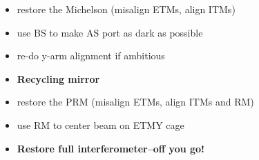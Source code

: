 \begin{itemize}
\item restore the Michelson (misalign ETMs, align ITMs) \vspace{-10pt}
\item use BS to make AS port as dark as possible \vspace{-10pt}
\item re-do y-arm alignment if ambitious 
\item[] \textbf{Recycling mirror} \vspace{-10pt}
\item restore the PRM (misalign ETMs, align ITMs and RM)
  \vspace{-10pt}
\item use RM to center beam on ETMY cage 
\item[] \textbf{Restore full interferometer--off you go!}
\end{itemize}







